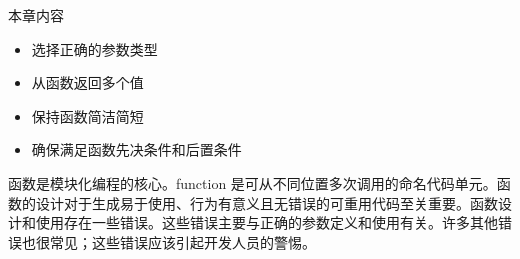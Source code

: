 本章内容

\begin{itemize}
\item
选择正确的参数类型

\item
从函数返回多个值

\item
保持函数简洁简短

\item
确保满足函数先决条件和后置条件
\end{itemize}

函数是模块化编程的核心。function 是可从不同位置多次调用的命名代码单元。函数的设计对于生成易于使用、行为有意义且无错误的可重用代码至关重要。函数设计和使用存在一些错误。这些错误主要与正确的参数定义和使用有关。许多其他错误也很常见；这些错误应该引起开发人员的警惕。
